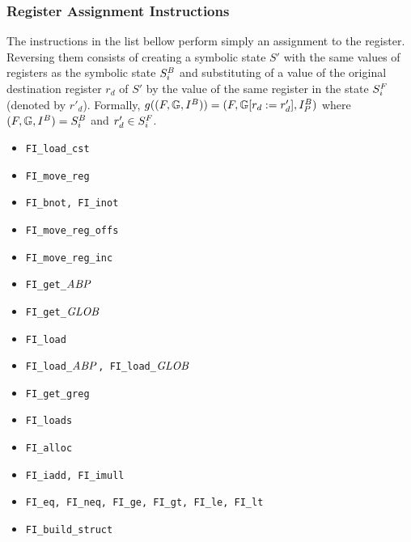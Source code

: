 \subsubsection{Register Assignment Instructions}
The instructions in the list bellow perform simply an assignment to the register.
Reversing them consists of creating a symbolic state $S'$ with
the same values of registers as the symbolic state $S^{B}_{i}$ and
substituting of a value of the original destination register $r_d$ of $S'$
by the value of the same register in the state $S^{F}_{i}$ (denoted by $r'_d$).
Formally, $g((F, \mathbb{G}, I^{B})) = (F, \mathbb{G} [r_{d} := r'_{d}]
			, I^{B}_{P})$
			where $(F, \mathbb{G}, I^{B}) = S^{B}_{i}$ and $r'_{d} \in S^{F}_{i}$.

\begin{itemize}

	\item {\tt FI\_load\_cst}

	\item {\tt FI\_move\_reg}

	\item {\tt FI\_bnot, FI\_inot}

	\item {\tt FI\_move\_reg\_offs}

	\item {\tt FI\_move\_reg\_inc}

	\item {\tt FI\_get\_$\mathit{ABP}$}

	\item {\tt FI\_get\_$\mathit{GLOB}$}

	\item {\tt FI\_load}
	
	\item {\tt FI\_load\_$\mathit{ABP}$, FI\_load\_$\mathit{GLOB}$}
	
	\item {\tt FI\_get\_greg}
	
	\item {\tt FI\_loads}
	
	\item {\tt FI\_alloc}

	\item {\tt FI\_iadd, FI\_imull}

	\item {\tt FI\_eq, FI\_neq, FI\_ge, FI\_gt, FI\_le, FI\_lt}
	
	\item {\tt FI\_build\_struct}

\end{itemize}

